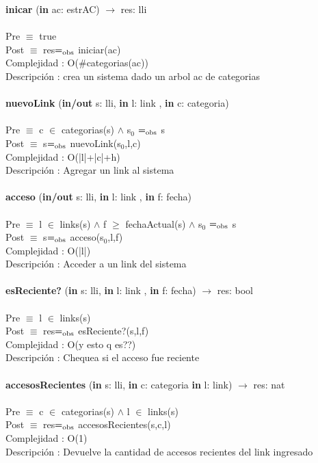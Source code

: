 \documentclass[10pt, a4paper]{article}
\begin{document}
	\textbf{inicar} (\textbf{in} ac: estrAC) $\longrightarrow$ res: lli\\\\
	Pre $\equiv$ {true}\\
	Post $\equiv$ {res$=_{\mathrm{obs}}$ iniciar(ac)}\\
	Complejidad : O($\#$categorias(ac))\\
	Descripci\'{o}n : crea un sistema dado un arbol ac de categorias\\\\
	
	\textbf{nuevoLink} (\textbf{in/out} s: lli, \textbf{in} l: link , \textbf{in} c: categoria) \\\\
	Pre $\equiv$ {c $\in$ categorias(s) $\wedge$ s${_0}$ $=_{\mathrm{obs}}$ s}\\
	Post $\equiv$ {s$=_{\mathrm{obs}}$ nuevoLink(s${_0}$,l,c)}\\
	Complejidad : O(|l|+|c|+h)\\
	Descripci\'{o}n : Agregar un link al sistema\\\\
	
	\textbf{acceso} (\textbf{in/out} s: lli, \textbf{in} l: link , \textbf{in} f: fecha) \\\\
	Pre $\equiv$ {l $\in$ links(s) $\wedge$ f $\geq$ fechaActual(s) $\wedge$ s${_0}$ $=_{\mathrm{obs}}$ s}\\
	Post $\equiv$ {s$=_{\mathrm{obs}}$ acceso(s${_0}$,l,f)}\\
	Complejidad : O(|l|)\\
	Descripci\'{o}n : Acceder a un link del sistema\\\\
		
	\textbf{esReciente?} (\textbf{in} s: lli, \textbf{in} l: link , \textbf{in} f: fecha) $\longrightarrow$ res: bool\\\\
	Pre $\equiv$ {l $\in$ links(s)}\\
	Post $\equiv$ {res$=_{\mathrm{obs}}$ esReciente?(s,l,f)}\\
	Complejidad : O(y esto q es??)\\
	Descripci\'{o}n : Chequea si el acceso fue reciente\\\\
	
	\textbf{accesosRecientes} (\textbf{in} s: lli, \textbf{in} c: categoria \textbf{in} l: link) $\longrightarrow$ res: nat\\\\
	Pre $\equiv$ {c $\in$ categorias(s) $\wedge$ l $\in$ links(s)}\\
	Post $\equiv$ {res$=_{\mathrm{obs}}$ accesosRecientes(s,c,l)}\\
	Complejidad : O(1)\\
	Descripci\'{o}n : Devuelve la cantidad de accesos recientes del link ingresado\\\\
	
\end{document}
